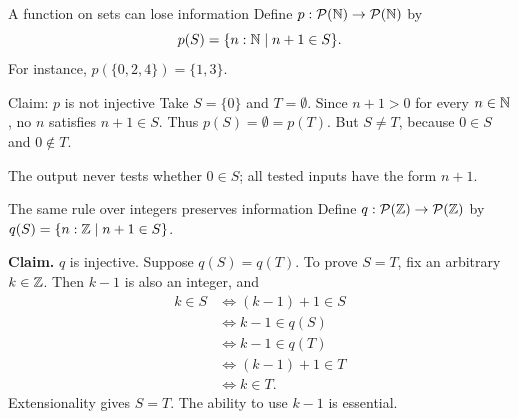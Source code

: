 \begin{frame}{A function on sets can lose information}
Define $p:\mathcal P(\mathbb{N})\to\mathcal P(\mathbb{N})$ by
\[
 p(S)=\{n:\mathbb{N}\mid n+1\in S\}.
\]
For instance, $p(\{0,2,4\})=\{1,3\}$.
\begin{block}{Claim: $p$ is not injective}
Take $S=\{0\}$ and $T=\emptyset$.
Since $n+1>0$ for every $n\in\mathbb{N}$, no $n$ satisfies $n+1\in S$.
Thus $p(S)=\emptyset=p(T)$.
But $S\ne T$, because $0\in S$ and $0\notin T$.
\end{block}
The output never tests whether $0\in S$; all tested inputs have the form $n+1$.
\end{frame}

\begin{frame}{The same rule over integers preserves information}
Define $q:\mathcal P(\mathbb{Z})\to\mathcal P(\mathbb{Z})$ by
$q(S)=\{n:\mathbb{Z}\mid n+1\in S\}$.
\medskip

\textbf{Claim.} $q$ is injective.
Suppose $q(S)=q(T)$. To prove $S=T$, fix an arbitrary $k\in\mathbb{Z}$.
Then $k-1$ is also an integer, and
\[
\begin{aligned}
 k\in S
 &\iff (k-1)+1\in S\\
 &\iff k-1\in q(S)\\
 &\iff k-1\in q(T)\\
 &\iff (k-1)+1\in T\\
 &\iff k\in T.
\end{aligned}
\]
Extensionality gives $S=T$. The ability to use $k-1$ is essential.
\end{frame}

